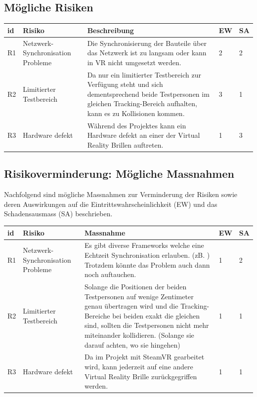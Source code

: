 \subsection{Mögliche Risiken}

\begin{center}
	\begin{tabularx}{\textwidth} { |l|B|B|l|l| }
		\hline
		\color{white} \textbf{id} & \color{white} \textbf{Risiko} & \color{white} \textbf{Beschreibung} & \color{white} \textbf{EW} & \color{white} \textbf{SA} \\
		\hline
		R1 & Netzwerk-Synchronisation Probleme & Die Synchronisierung der Bauteile über das Netzwerk ist zu langsam oder kann in VR nicht umgesetzt werden. & 2 & 2 \\
		\hline
		R2 & Limitierter Testbereich & Da nur ein limitierter Testbereich zur Verfügung steht und sich dementsprechend beide Testpersonen im gleichen Tracking-Bereich aufhalten, kann es zu Kollisionen kommen. & 3 & 1 \\
		\hline
		R3 & Hardware defekt & Während des Projektes kann ein Hardware defekt an einer der Virtual Reality Brillen auftreten. & 1 & 3 \\
		\hline
	\end{tabularx}
\end{center}
\label{tbl:risiken_vorher}

\subsection{Risikoverminderung: Mögliche Massnahmen}
Nachfolgend sind mögliche Massnahmen zur Verminderung der Risiken sowie deren Auswirkungen auf die Eintrittswahrscheinlichkeit (EW) und das Schadensausmass (SA) beschrieben.

\begin{center}
	\begin{tabularx}{\textwidth} { |l|B|B|l|l| }
		\hline
		\color{white} \textbf{id} & \color{white} \textbf{Risiko} & \color{white} \textbf{Massnahme} & \color{white} \textbf{EW} & \color{white} \textbf{SA} \\
		\hline
		R1 & Netzwerk-Synchronisation Probleme & Es gibt diverse Frameworks welche eine Echtzeit Synchronisation erlauben. (zB. \cite{noauthor_photon_2019}) Trotzdem könnte das Problem auch dann noch auftauchen. & 1 & 2 \\
		\hline
		R2 & Limitierter Testbereich & Solange die Positionen der beiden Testpersonen auf wenige Zentimeter genau übertragen wird und die Tracking-Bereiche bei beiden exakt die gleichen sind, sollten die Testpersonen nicht mehr miteinander kollidieren. (Solange sie darauf achten, wo sie hingehen)  & 1 & 1 \\
		\hline
		R3 & Hardware defekt & Da im Projekt mit SteamVR gearbeitet wird, kann jederzeit auf eine andere Virtual Reality Brille zurückgegriffen werden. & 1 & 1 \\
		\hline
	\end{tabularx}
\end{center}
\label{tbl:risiken_nachher}

